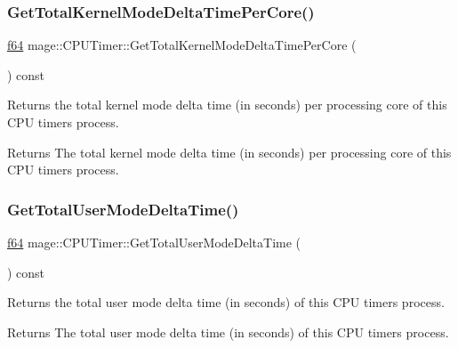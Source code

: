 \subsubsection{\texorpdfstring{Get\+Total\+Kernel\+Mode\+Delta\+Time\+Per\+Core()}{GetTotalKernelModeDeltaTimePerCore()}}
{\footnotesize\ttfamily \hyperlink{namespacemage_ab935747c6941320bd6214b5a5f265b09}{f64} mage\+::\+C\+P\+U\+Timer\+::\+Get\+Total\+Kernel\+Mode\+Delta\+Time\+Per\+Core (\begin{DoxyParamCaption}{ }\end{DoxyParamCaption}) const\hspace{0.3cm}{\ttfamily [noexcept]}}

Returns the total kernel mode delta time (in seconds) per processing core of this C\+PU timer\textquotesingle{}s process.

\begin{DoxyReturn}{Returns}
The total kernel mode delta time (in seconds) per processing core of this C\+PU timer\textquotesingle{}s process. 
\end{DoxyReturn}
\hypertarget{classmage_1_1_c_p_u_timer_ae902f1aa7006ad96caadd558f6809ce7}{}\label{classmage_1_1_c_p_u_timer_ae902f1aa7006ad96caadd558f6809ce7} 
\subsubsection{\texorpdfstring{Get\+Total\+User\+Mode\+Delta\+Time()}{GetTotalUserModeDeltaTime()}}
{\footnotesize\ttfamily \hyperlink{namespacemage_ab935747c6941320bd6214b5a5f265b09}{f64} mage\+::\+C\+P\+U\+Timer\+::\+Get\+Total\+User\+Mode\+Delta\+Time (\begin{DoxyParamCaption}{ }\end{DoxyParamCaption}) const\hspace{0.3cm}{\ttfamily [noexcept]}}

Returns the total user mode delta time (in seconds) of this C\+PU timer\textquotesingle{}s process.

\begin{DoxyReturn}{Returns}
The total user mode delta time (in seconds) of this C\+PU timer\textquotesingle{}s process. 
\end{DoxyReturn}
\hypertarget{classmage_1_1_c_p_u_timer_afb9c6aee25bd70044ea0615a5a1bb75c}{}\label{classmage_1_1_c_p_u_timer_afb9c6aee25bd70044ea0615a5a1bb75c} 
